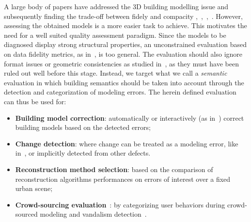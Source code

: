 \documentclass[runningheads]{llncs}
\begin{document}
A large body of papers have addressed the 3D building modelling issue and subsequently finding the trade-off between fidely and compacity \cite{dick2004modelling},~\cite{zebedin2008fusion},~\cite{Lafarge2010},~\cite{verdie2015lod}. However, assessing the obtained models is a more easier task to achieve. This motivates the need for a well suited quality assessment paradigm. Since the models to be diagnosed display strong structural properties, an unconstrained evaluation based on data fidelity metrics, as in~\cite{berger2013benchmark}, is too general. The evaluation should also ignore format issues or geometric consistencies as studied in~\cite{ledoux2018val3dity}, as they must have been ruled out well before this stage. Instead, we target what we call a \textit{semantic} evaluation in which building semantics should be taken into account through the detection and categorization of modeling errors. The herein defined evaluation can thus be used for:
    \begin{itemize}
        \item \textbf{Building model correction}: automatically or interactively (as in~\cite{kowdle2011active}) correct building models based on the detected errors;
        \item \textbf{Change detection}: where change can be treated as a modeling error, like in~\cite{taneja2015geometric}, or implicitly detected from other defects.
        \item \textbf{Reconstruction method selection}: based on the comparison of reconstruction algorithms performances on errors of interest over a fixed urban scene;
        \item \textbf{Crowd-sourcing evaluation}~\cite{kovashka2016crowdsourcing}: by categorizing user behaviors during crowd-sourced modeling and vandalism detection~\cite{neis2012towards}.
    \end{itemize}
\end{document}
